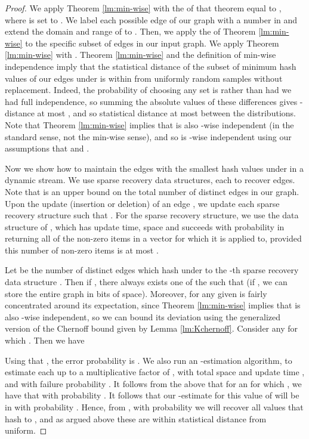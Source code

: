 \begin{proof}
We apply Theorem \ref{lm:min-wise} with the  of that theorem equal to , where  is set to . We label each possible edge of our graph with a number in  and extend the domain and range of  to . Then, we apply the  of Theorem \ref{lm:min-wise} to the specific subset of  edges in our input graph. We apply Theorem \ref{lm:min-wise}
with . Theorem \ref{lm:min-wise} and the definition of min-wise independence imply that the statistical distance of the subset  of  minimum hash values of our edges under  is within  from  uniformly random samples without replacement. Indeed, the probability of choosing any set  is  rather than  had we had full independence, so summing the absolute values of these differences gives -distance at most , and so statistical distance at most  between the distributions. 
Note that Theorem \ref{lm:min-wise} implies
that  is also -wise independent (in the standard sense, not the min-wise
sense), and so  is -wise independent using our assumptions that  and
. 

Now we show how 
to maintain the  edges with the smallest hash values under  in a dynamic stream. 
We use  sparse recovery data structures,  each to recover  edges. Note that  is an upper bound on the total number of distinct edges in our graph. Upon the update (insertion or deletion) of an edge , we update each sparse recovery structure  such that . For the sparse recovery structure, we use the data structure of \cite{glps10}, which has  update time, space  and succeeds with probability  in returning all of the non-zero items
in a vector for which it is applied to, provided this number of non-zero items is at most . 

Let  be the number of distinct edges which hash under  to the -th sparse recovery
data structure . Then if , there always exists one of the  such that  (if , we can store the entire graph in  bits of space). Moreover,  for any given  is fairly concentrated around its expectation, since Theorem \ref{lm:min-wise} implies that  is also -wise independent, so we can bound its deviation using the generalized version of the Chernoff bound given by Lemma \ref{lm:Kchernoff}. Consider any  for which . Then we have 

Using that , the error probability is . We also run an -estimation algorithm, to estimate
each  up to a multiplicative factor of , with total space  and update time  \cite{cdim03}, 
and with failure probability . It follows
from the above that for an  for which , we have that  with
probability . It follows that our -estimate for this value of  will be in  with
probability . Hence, from , with probability  we will recover all values that hash to ,
and as argued above these are within statistical distance  from uniform.
\end{proof}

